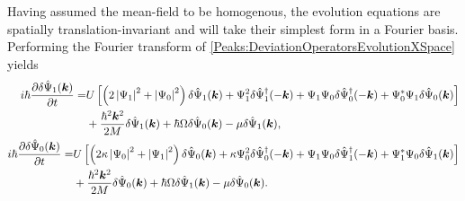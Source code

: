 Having assumed the mean-field to be homogenous, the evolution equations are spatially translation-invariant and will take their simplest form in a Fourier basis. Performing the Fourier transform of \eqref{Peaks:DeviationOperatorsEvolutionXSpace} yields
\begin{subequations}
    \label{Peaks:DeviationOperatorsEvolutionKSpace}
    \begin{align}
        \begin{split}
            i \hbar \frac{\partial \delta \hat{\Psi}_1(\bm{k})}{\partial t} =& U\left[ \left(2\abs{\Psi_1}^2+\abs{\Psi_0}^2 \right)\delta \hat{\Psi}_1(\bm{k}) + \Psi_1^2\delta\hat{\Psi}_1^\dagger(-\bm{k}) + \Psi_1\Psi_0\delta\hat{\Psi}_0^\dagger(-\bm{k}) + \Psi_0^*\Psi_1\delta\hat{\Psi}_0(\bm{k})\right]\\
                    & +\frac{\hbar^2 \bm{k}^2}{2M} \delta \hat{\Psi}_1(\bm{k}) +\hbar \Omega\delta\hat{\Psi}_0(\bm{k})- \mu \delta \hat{\Psi}_1(\bm{k}),
        \end{split}\\
        \begin{split}
        i \hbar \frac{\partial \delta \hat{\Psi}_0(\bm{k})}{\partial t} =& U\left[\left(2\kappa \abs{\Psi_0}^2 +\abs{\Psi_1}^2\right)\delta\hat{\Psi}_0(\bm{k}) + \kappa \Psi_0^2 \delta\hat{\Psi}_0^\dagger(-\bm{k}) + \Psi_1\Psi_0\delta\hat{\Psi}_1^\dagger(-\bm{k}) + \Psi_1^*\Psi_0\delta\hat{\Psi}_1(\bm{k})\right]\\
                    & +\frac{\hbar^2 \bm{k}^2}{2M} \delta \hat{\Psi}_0(\bm{k}) +\hbar \Omega\delta\hat{\Psi}_1(\bm{k}) - \mu \delta\hat{\Psi}_0(\bm{k}).
        \end{split}
    \end{align}
\end{subequations}

